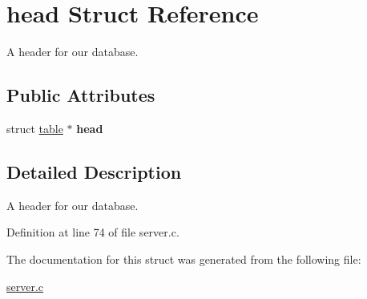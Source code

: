 \hypertarget{structhead}{
\section{head Struct Reference}
\label{structhead}
}


A header for our database.  


\subsection*{Public Attributes}
\begin{DoxyCompactItemize}
\item 
\hypertarget{structhead_a84b6395a11f483fad86aec80cfdd17bf}{
struct \hyperlink{structtable}{table} $\ast$ {\bfseries head}}
\label{structhead_a84b6395a11f483fad86aec80cfdd17bf}

\end{DoxyCompactItemize}


\subsection{Detailed Description}
A header for our database. 

Definition at line 74 of file server.c.



The documentation for this struct was generated from the following file:\begin{DoxyCompactItemize}
\item 
\hyperlink{server_8c}{server.c}\end{DoxyCompactItemize}
